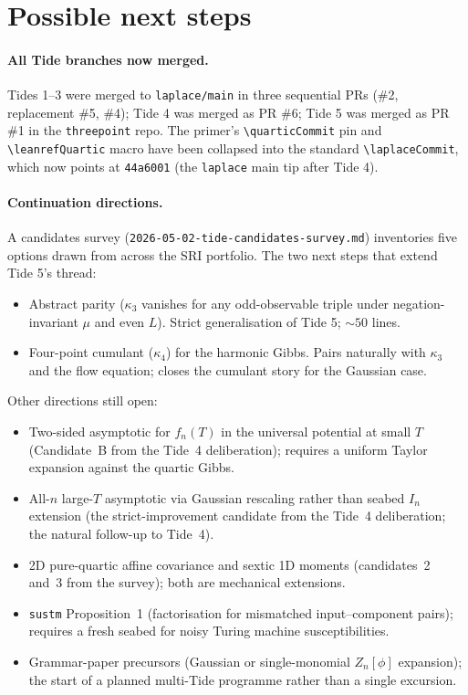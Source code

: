 \documentclass[11pt]{article}
\begin{document}
\section{Possible next steps}

\paragraph{All Tide branches now merged.} Tides 1--3 were merged to
\texttt{laplace/main} in three sequential PRs (\#2, replacement \#5,
\#4); Tide 4 was merged as PR \#6; Tide 5 was merged as PR \#1 in the
\texttt{threepoint} repo. The primer's
\texttt{\textbackslash quarticCommit} pin and
\texttt{\textbackslash leanrefQuartic} macro have been collapsed into
the standard \texttt{\textbackslash laplaceCommit}, which now points
at \texttt{44a6001} (the \texttt{laplace} main tip after Tide 4).

\paragraph{Continuation directions.} A candidates survey
(\texttt{2026-05-02-tide-candidates-survey.md}) inventories five
options drawn from across the SRI portfolio. The two next steps that
extend Tide 5's thread:
\begin{itemize}
\item Abstract parity ($\kappa_3$ vanishes for any odd-observable
triple under negation-invariant $\mu$ and even $L$). Strict
generalisation of Tide 5; ${\sim}50$ lines.
\item Four-point cumulant ($\kappa_4$) for the harmonic Gibbs.
Pairs naturally with $\kappa_3$ and the flow equation; closes the
cumulant story for the Gaussian case.
\end{itemize}
Other directions still open:
\begin{itemize}
\item Two-sided asymptotic for $f_n(T)$ in the universal potential at
small $T$ (Candidate~B from the Tide~4 deliberation); requires a
uniform Taylor expansion against the quartic Gibbs.
\item All-$n$ large-$T$ asymptotic via Gaussian rescaling rather than
seabed $I_n$ extension (the strict-improvement candidate from the
Tide~4 deliberation; the natural follow-up to Tide~4).
\item 2D pure-quartic affine covariance and sextic 1D moments
(candidates~2 and~3 from the survey); both are mechanical extensions.
\item \texttt{sustm} Proposition~1 (factorisation for mismatched
input--component pairs); requires a fresh seabed for noisy Turing
machine susceptibilities.
\item Grammar-paper precursors (Gaussian or single-monomial $Z_n[\phi]$
expansion); the start of a planned multi-Tide programme rather than a
single excursion.
\end{itemize}
\end{document}
